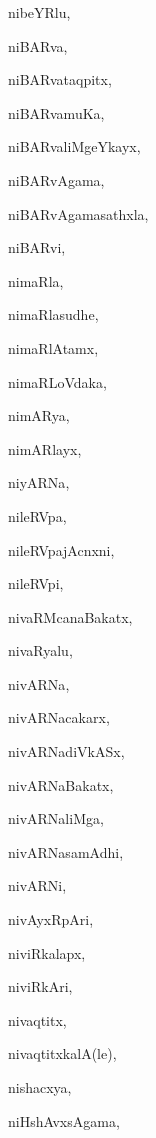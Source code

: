 \begin{multicols}{2}
{nibeYRlu}, \pageref{nibeYRlu}

{niBARva}, \pageref{niBARva}

{niBARvataqpitx}, \pageref{niBARvataqpitx}

{niBARvamuKa}, \pageref{niBARvamuKa}

{niBARvaliMgeYkayx}, \pageref{niBARvaliMgeYkayx}

{niBARvAgama}, \pageref{niBARvAgama}

{niBARvAgamasathxla}, \pageref{niBARvAgamasathxla}

{niBARvi}, \pageref{niBARvi}

{nimaRla}, \pageref{nimaRla}

{nimaRlasudhe}, \pageref{nimaRlasudhe}

{nimaRlAtamx}, \pageref{nimaRlAtamx}

{nimaRLoVdaka}, \pageref{nimaRLoVdaka}

{nimARya}, \pageref{nimARya}

{nimARlayx}, \pageref{nimARlayx}

{niyARNa}, \pageref{niyARNa}

{nileRVpa}, \pageref{nileRVpa}

{nileRVpajAcnxni}, \pageref{nileRVpajAcnxni}

{nileRVpi}, \pageref{nileRVpi}

{nivaRMcanaBakatx}, \pageref{nivaRMcanaBakatx}

{nivaRyalu}, \pageref{nivaRyalu}

{nivARNa}, \pageref{nivARNa}

{nivARNacakarx}, \pageref{nivARNacakarx}

{nivARNadiVkASx}, \pageref{nivARNadiVkASx}

{nivARNaBakatx}, \pageref{nivARNaBakatx}

{nivARNaliMga}, \pageref{nivARNaliMga}

{nivARNasamAdhi}, \pageref{nivARNasamAdhi}

{nivARNi}, \pageref{nivARNi}

{nivAyxRpAri}, \pageref{nivAyxRpAri}

{niviRkalapx}, \pageref{niviRkalapx}

{niviRkAri}, \pageref{niviRkAri}

{nivaqtitx}, \pageref{nivaqtitx}

{nivaqtitxkalA(le)}, \pageref{nivaqtitxkalAle}

{nishacxya}, \pageref{nishacxya}

{niHshAvxsAgama}, \pageref{niHshAvxsAgama}


\end{multicols}
